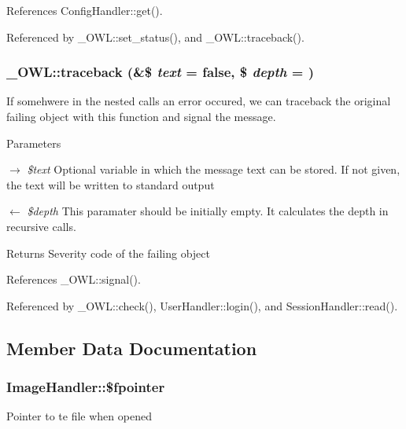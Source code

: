 References ConfigHandler::get().



Referenced by \_\-OWL::set\_\-status(), and \_\-OWL::traceback().

\subsubsection[{traceback}]{\setlength{\rightskip}{0pt plus 5cm}\_\-OWL::traceback (\&\$ {\em text} = {\ttfamily false}, \/  \$ {\em depth} = {})}\label{class__OWL_aa29547995d6741b7d2b90c1d4ea99a13}
If somehwere in the nested calls an error occured, we can traceback the original failing object with this function and signal the message.


\begin{DoxyParams}{Parameters}
\item[\mbox{$\rightarrow$} {\em \$text}]Optional variable in which the message text can be stored. If not given, the text will be written to standard output \item[\mbox{$\leftarrow$} {\em \$depth}]This paramater should be initially empty. It calculates the depth in recursive calls. \end{DoxyParams}
\begin{DoxyReturn}{Returns}
Severity code of the failing object 
\end{DoxyReturn}


References \_\-OWL::signal().



Referenced by \_\-OWL::check(), UserHandler::login(), and SessionHandler::read().



\subsection{Member Data Documentation}
\subsubsection[{\$fpointer}]{\setlength{\rightskip}{0pt plus 5cm}ImageHandler::\$fpointer}\label{classImageHandler_ac56acda82f7ece75d33f6c57845a727e}
Pointer to te file when opened 

